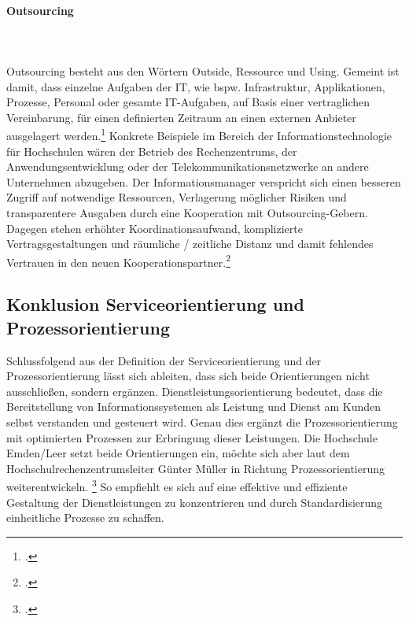 \paragraph{Outsourcing}\mbox{}\\\\
Outsourcing besteht aus den Wörtern \glqq Outside\grqq{}, \glqq Ressource\grqq{} und \glqq Using\grqq{}. Gemeint ist damit, dass einzelne Aufgaben der IT, wie bspw. Infrastruktur, Applikationen, Prozesse, Personal oder gesamte IT-Aufgaben, auf Basis einer vertraglichen Vereinbarung, für einen definierten Zeitraum an einen externen Anbieter ausgelagert werden.\footcite[Vgl.][164]{krcmar_einfuhrung_2015} Konkrete Beispiele im Bereich der Informationstechnologie für Hochschulen wären der Betrieb des Rechenzentrums, der Anwendungsentwicklung oder der Telekommunikationsnetzwerke an andere Unternehmen abzugeben. Der Informationsmanager verspricht sich einen besseren Zugriff auf notwendige Ressourcen, Verlagerung möglicher Risiken und transparentere Ausgaben durch eine Kooperation mit Outsourcing-Gebern. Dagegen stehen erhöhter Koordinationsaufwand, komplizierte Vertragsgestaltungen und räumliche / zeitliche Distanz und damit fehlendes Vertrauen in den neuen Kooperationspartner.\footcite[Vgl.][195 ff.]{barthelemy_2001}

\subsection{Konklusion Serviceorientierung und Prozessorientierung}
Schlussfolgend aus der Definition der Serviceorientierung und der Prozessorientierung lässt sich ableiten, dass sich beide Orientierungen nicht ausschließen, sondern ergänzen.  Dienstleistungsorientierung bedeutet, dass die Bereitstellung von Informationssystemen als Leistung und Dienst am Kunden selbst verstanden und gesteuert wird. Genau dies ergänzt die Prozessorientierung mit optimierten Prozessen zur Erbringung dieser Leistungen. 
Die Hochschule Emden/Leer setzt beide Orientierungen ein, möchte sich aber laut dem Hochschulrechenzentrumsleiter Günter Müller in Richtung Prozessorientierung weiterentwickeln. \footcite{gunter_muller_interview} So empfiehlt es sich auf eine effektive und effiziente Gestaltung der Dienstleistungen zu konzentrieren und durch Standardisierung einheitliche Prozesse zu schaffen.



